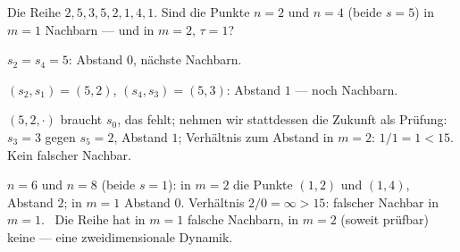 \begin{aufgabe}
Die Reihe $2, 5, 3, 5, 2, 1, 4, 1$. Sind die Punkte $n = 2$ und $n = 4$ (beide $s = 5$) in $m = 1$ Nachbarn --- und in $m = 2$, $\tau = 1$?

\loesung
{}
$s_2 = s_4 = 5$: Abstand $0$, nächste Nachbarn.

$(s_2, s_1) = (5, 2)$, $(s_4, s_3) = (5, 3)$: Abstand $1$ --- noch Nachbarn.

$(5, 2, \cdot)$ braucht $s_0$, das fehlt; nehmen wir stattdessen die Zukunft als Prüfung: $s_3 = 3$ gegen $s_5 = 2$, Abstand $1$; Verhältnis zum Abstand in $m = 2$: $1/1 = 1 < 15$. Kein falscher Nachbar.

$n = 6$ und $n = 8$ (beide $s = 1$): in $m = 2$ die Punkte $(1, 2)$ und $(1, 4)$, Abstand $2$; in $m = 1$ Abstand $0$. Verhältnis $2/0 = \infty > 15$: falscher Nachbar in $m = 1$. \checkmark\ Die Reihe hat in $m = 1$ falsche Nachbarn, in $m = 2$ (soweit prüfbar) keine --- eine zweidimensionale Dynamik.

\begin{center}
\begin{minipage}{0.88\textwidth}
\end{minipage}
\end{center}
\end{aufgabe}

